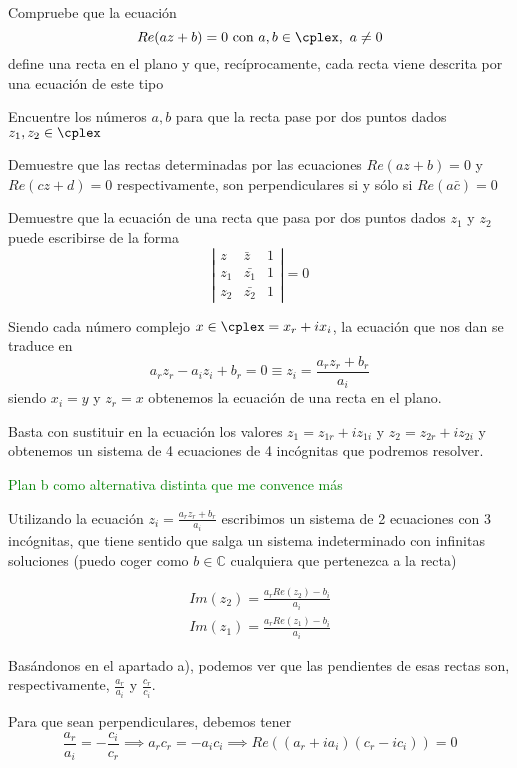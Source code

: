 \begin{problem}[15]

\ppart
Compruebe que la ecuación
\[Re(az+b) = 0 \text{ con } a,b\in \cplex, \ a \neq 0\]
define una recta en el plano y que, recíprocamente, cada recta viene descrita por una ecuación de este tipo

\ppart
Encuentre los números $a,b$ para que la recta pase por dos puntos dados $z_1, z_2 \in \cplex$

\ppart
Demuestre que las rectas determinadas por las ecuaciones $Re(az+b)=0$ y $Re(cz+d)=0$ respectivamente, son perpendiculares si y sólo si $Re(a\bar{c})=0$

\ppart
Demuestre que la ecuación de una recta que pasa por dos puntos dados $z_1$ y $z_2$ puede escribirse de la forma
\[ \left| \begin{array}{ccc}
z  & \bar{z} & 1 \\
z_1 & \bar{z_1}&  1 \\
z_2 & \bar{z_2} & 1 \end{array} \right| = 0\]

\solution
{}

\spart

Siendo cada número complejo $x\in \cplex = x_r+ix_i$, la ecuación que nos dan se traduce en
\[a_rz_r-a_iz_i+b_r=0 \equiv z_i = \frac{a_rz_r+b_r}{a_i}\]
siendo $x_i = y$ y $z_r = x$ obtenemos la ecuación de una recta en el plano.

\spart

Basta con sustituir en la ecuación los valores $z_1=z_{1r}+iz_{1i}$ y $z_2=z_{2r}+iz_{2i}$ y obtenemos un sistema de 4 ecuaciones de 4 incógnitas que podremos resolver.

\textcolor{green}{Plan b como alternativa distinta que me convence más}

Utilizando la ecuación $z_i = \displaystyle\frac{a_rz_r+b_r}{a_i}$ escribimos un sistema de 2 ecuaciones con 3 incógnitas, que tiene sentido que salga un sistema indeterminado con infinitas soluciones (puedo coger como $b∈ℂ$ cualquiera que pertenezca a la recta)

\[
\begin{array}{cc}
Im(z_2) = \frac{a_r Re(z_2) - b_i}{a_i}\\
Im(z_1) = \frac{a_r Re(z_1) - b_i}{a_i}
\end{array}
\]

\spart

Basándonos en el apartado a), podemos ver que las pendientes de esas rectas son, respectivamente, $\frac{a_r}{a_i}$ y $\frac{c_r}{c_i}$.

Para que sean perpendiculares, debemos tener
\[\frac{a_r}{a_i}= - \frac{c_i}{c_r} \implies a_rc_r = -a_ic_i \implies Re\left((a_r+ia_i)(c_r-ic_i)\right) = 0\]

\spart

\end{problem}

